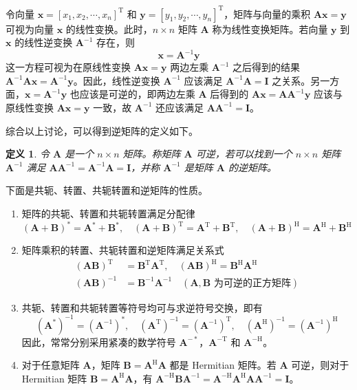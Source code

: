 \documentclass[punct=kaiming, fontset=fandol]{ctexbook}
\numberwithin{equation}{section}
\theoremstyle{mystyle}
\newtheorem{defn}{定义}[section]
\def\TT{\symsfup{T}}
\def\HH{\symsfup{H}}
\def\bf#1{\symbfit{#1}}
\def\TT{\mathrm{T}}
\def\HH{\mathrm{H}}
\def\bf#1{\bm{#1}}
\begin{document}
  令向量 $\bf x = [x_1,x_2,\cdots,x_n]^{\TT}$ 和 $\bf y = [y_1,y_2,\cdots,y_n]^{\TT}$，矩阵与向量的乘积 $\bf A \bf x = \bf y$ 可视为向量 $\bf x$ 的线性变换。此时，$n \times n$ 矩阵 $\bf A$ 称为线性变换矩阵。若向量 $\bf y$ 到 $\bf x$ 的线性逆变换 $\bf A^{-1}$ 存在，则
  \begin{equation}
    \bf x = \bf A^{-1} \bf y
  \end{equation}
  这一方程可视为在原线性变换 $\bf A \bf x = \bf y$ 两边左乘 $\bf A^{-1}$ 之后得到的结果 $\bf A^{-1} \bf A \bf x = \bf A^{-1} \bf y$。因此，线性逆变换 $\bf A^{-1}$ 应该满足 $\bf A^{-1} \bf A = \bf I$ 之关系。另一方面，$ \bf x = \bf A^{-1} \bf y$ 也应该是可逆的，即两边左乘 $\bf A$ 后得到的 $\bf A \bf x = \bf A \bf A^{-1} \bf y$ 应该与原线性变换 $\bf A \bf x = \bf y$ 一致，故 $\bf A^{-1}$ 还应该满足 $\bf A \bf A^{-1} = \bf I$。

  综合以上讨论，可以得到逆矩阵的定义如下。
  \begin{defn}
    令 $\bf A$ 是一个 $n \times n$ 矩阵。称矩阵 $\bf A$ 可逆，若可以找到一个 $n \times n$ 矩阵 $\bf A^{-1}$ 满足 $\bf A \bf A^{-1} = \bf A^{-1} \bf A = \bf I$，并称 $\bf A^{-1}$ 是矩阵 $\bf A$ 的逆矩阵。
  \end{defn}
  下面是共轭、转置、共轭转置和逆矩阵的性质。
  \begin{enumerate}
    \item 矩阵的共轭、转置和共轭转置满足分配律
    \[
      (\bf A + \bf B)^* = \bf A^* + \bf B^*, \quad
      (\bf A + \bf B)^{\TT} = \bf A^{\TT} + \bf B^{\TT}, \quad
      (\bf A + \bf B)^{\HH} = \bf A^{\HH} + \bf B^{\HH}
    \]
    \item 矩阵乘积的转置、共轭转置和逆矩阵满足关系式
    \begin{align*}
      (\bf A \bf B)^{\TT} &=  \bf B^{\TT} \bf A^{\TT}, \quad (\bf A \bf B)^{\HH} = \bf B^{\HH} \bf A^{\HH} \\
      (\bf A \bf B)^{-1}  &=  \bf B^{-1} \bf A^{-1} \quad (\bf A,\bf B \text{ 为可逆的正方矩阵})
    \end{align*}
    \item 共轭、转置和共轭转置等符号均可与求逆符号交换，即有
    \[
      (\bf A^*)^{-1} = (\bf A^{-1})^*, \quad
      (\bf A^{\TT})^{-1} = (\bf A^{-1})^{\TT}, \quad
      (\bf A^{\HH})^{-1} = (\bf A^{-1})^{\HH}
    \]
    因此，常常分别采用紧凑的数学符号 $\bf A^{-*}$，$\bf A^{-\TT}$ 和 $\bf A^{-\HH}$。
    \item 对于任意矩阵 $\bf A$，矩阵 $\bf B = \bf A^{\HH} \bf A$ 都是 Hermitian 矩阵。若 $\bf A$ 可逆，则对于 Hermitian 矩阵 $\bf B = \bf A^{\HH} \bf A$，有 $\bf A^{-\HH} \bf B \bf A^{-1} = \bf A^{-\HH} \bf A^{\HH} \bf A \bf A^{-1} = \bf I$。
  \end{enumerate}
\end{document}
